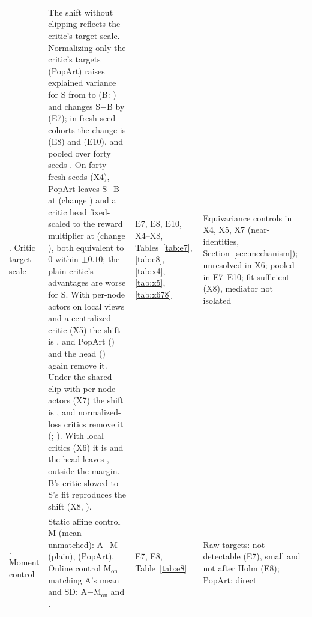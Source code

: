 \begin{table}[!htbp]
\begin{tabular}{@{}>{\raggedright\arraybackslash}p{}>{\raggedright\arraybackslash}p{}>{\raggedright\arraybackslash}p{}>{\raggedright\arraybackslash}p{}@{}}
5. Critic target scale & The shift without clipping reflects the critic's target scale. Normalizing only the critic's targets (PopArt) raises explained variance for S from \VsevenEVPlainS{} to \VsevenEVPopS{} (B: \VsevenEVPopB{}) and changes S$-$B by \VjtChSeven{} (E7); in fresh-seed cohorts the change is \VjtChEight{} (E8) and \VjtChTen{} (E10), and pooled over forty seeds \VjtChPool{}. On forty fresh seeds (X4), PopArt leaves S$-$B at \VxfPop{} (change \VxfChPop{}) and a critic head fixed-scaled to the reward multiplier at \VxfHead{} (change \VxfChHead{}), both equivalent to 0 within $\pm0.10$; the plain critic's advantages are worse for S. With per-node actors on local views and a centralized critic (X5) the shift is \VxvPlain{}, and PopArt (\VxvPop{}) and the head (\VxvHead{}) again remove it. Under the shared clip with per-node actors (X7) the shift is \VxsevPlain{}, and normalized-loss critics remove it (\VxsevHead{}; \VxsevPop{}). With local critics (X6) it is \VxsixPlain{} and the head leaves \VxsixHead{}, outside the margin. B's critic slowed to S's fit reproduces the shift (X8, \VxeiDeg{}). & E7, E8, E10, X4--X8, Tables~\ref{tab:e7}, \ref{tab:e8}, \ref{tab:x4}, \ref{tab:x5}, \ref{tab:x678} & Equivariance controls in X4, X5, X7 (near-identities, Section~\ref{sec:mechanism}); unresolved in X6; pooled in E7--E10; fit sufficient (X8), mediator not isolated \\
6. Moment control & Static affine control M (mean unmatched): A$-$M \VjtSSevenAMPlain{} (plain), \VjtSSevenAMPop{} (PopArt). Online control M$_{\mathrm{on}}$ matching A's mean and SD: A$-$M$_{\mathrm{on}}$ \VjtPAMonPlain{} and \VjtPAMonPop{}. & E7, E8, Table~\ref{tab:e8} & Raw targets: not detectable (E7), small and not after Holm (E8); PopArt: direct \\
\bottomrule
\end{tabular}
\end{table}
